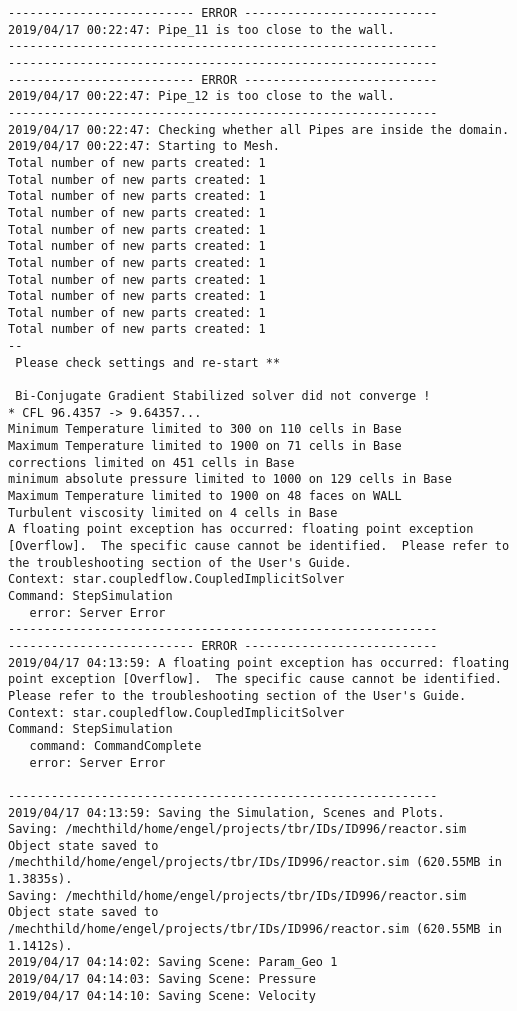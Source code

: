 \documentclass{article}
\begin{document}
{\begin{verbatim}
-------------------------- ERROR ---------------------------
2019/04/17 00:22:47: Pipe_11 is too close to the wall.
------------------------------------------------------------
------------------------------------------------------------
-------------------------- ERROR ---------------------------
2019/04/17 00:22:47: Pipe_12 is too close to the wall.
------------------------------------------------------------
2019/04/17 00:22:47: Checking whether all Pipes are inside the domain.
2019/04/17 00:22:47: Starting to Mesh.
Total number of new parts created: 1
Total number of new parts created: 1
Total number of new parts created: 1
Total number of new parts created: 1
Total number of new parts created: 1
Total number of new parts created: 1
Total number of new parts created: 1
Total number of new parts created: 1
Total number of new parts created: 1
Total number of new parts created: 1
Total number of new parts created: 1
--
 Please check settings and re-start ** 

 Bi-Conjugate Gradient Stabilized solver did not converge !
* CFL 96.4357 -> 9.64357...
Minimum Temperature limited to 300 on 110 cells in Base
Maximum Temperature limited to 1900 on 71 cells in Base
corrections limited on 451 cells in Base
minimum absolute pressure limited to 1000 on 129 cells in Base
Maximum Temperature limited to 1900 on 48 faces on WALL
Turbulent viscosity limited on 4 cells in Base
A floating point exception has occurred: floating point exception [Overflow].  The specific cause cannot be identified.  Please refer to the troubleshooting section of the User's Guide.
Context: star.coupledflow.CoupledImplicitSolver
Command: StepSimulation
   error: Server Error
------------------------------------------------------------
-------------------------- ERROR ---------------------------
2019/04/17 04:13:59: A floating point exception has occurred: floating point exception [Overflow].  The specific cause cannot be identified.  Please refer to the troubleshooting section of the User's Guide.
Context: star.coupledflow.CoupledImplicitSolver
Command: StepSimulation
   command: CommandComplete
   error: Server Error

------------------------------------------------------------
2019/04/17 04:13:59: Saving the Simulation, Scenes and Plots.
Saving: /mechthild/home/engel/projects/tbr/IDs/ID996/reactor.sim
Object state saved to /mechthild/home/engel/projects/tbr/IDs/ID996/reactor.sim (620.55MB in 1.3835s).
Saving: /mechthild/home/engel/projects/tbr/IDs/ID996/reactor.sim
Object state saved to /mechthild/home/engel/projects/tbr/IDs/ID996/reactor.sim (620.55MB in 1.1412s).
2019/04/17 04:14:02: Saving Scene: Param_Geo 1
2019/04/17 04:14:03: Saving Scene: Pressure
2019/04/17 04:14:10: Saving Scene: Velocity
\end{verbatim}
}
\clearpage
\end{document}
